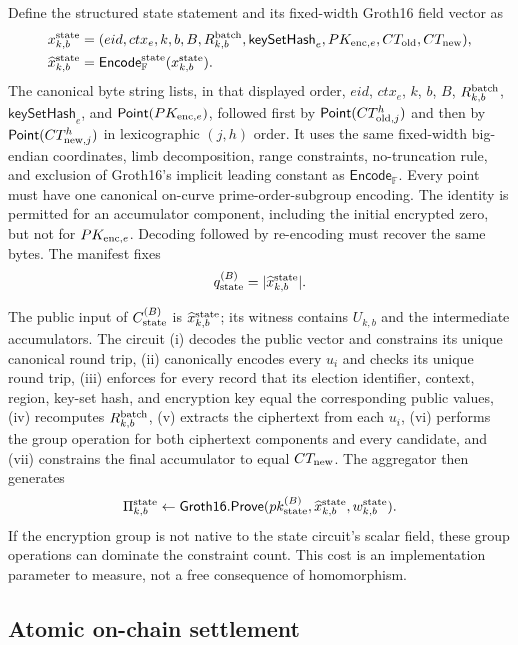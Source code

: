 \documentclass[pdflatex,sn-mathphys-num]{sn-jnl}%
\theoremstyle{thmstyleone}%
\theoremstyle{thmstyletwo}%
\theoremstyle{thmstylethree}%
\begin{document}
Define the structured state statement and its fixed-width Groth16 field vector as
\[
\begin{aligned}
 x_{k,b}^{\rm state}&=(eid,ctx_e,k,b,B,R^{\rm batch}_{k,b},
 \mathsf{keySetHash}_e,PK_{{\rm enc},e},CT_{\rm old},CT_{\rm new}),\\
 \widehat x_{k,b}^{\rm state}&=
 \mathsf{Encode}_{\mathbb F}^{\rm state}(x_{k,b}^{\rm state}).
\end{aligned}
\]
The canonical byte string lists, in that displayed order, $eid$, $ctx_e$, $k$, $b$, $B$, $R^{\rm batch}_{k,b}$, $\mathsf{keySetHash}_e$, and $\mathsf{Point}(PK_{{\rm enc},e})$, followed first by $\mathsf{Point}(CT_{{\rm old},j}^{h})$ and then by $\mathsf{Point}(CT_{{\rm new},j}^{h})$ in lexicographic $(j,h)$ order. It uses the same fixed-width big-endian coordinates, limb decomposition, range constraints, no-truncation rule, and exclusion of Groth16's implicit leading constant as $\mathsf{Encode}_{\mathbb F}$. Every point must have one canonical on-curve prime-order-subgroup encoding. The identity is permitted for an accumulator component, including the initial encrypted zero, but not for $PK_{{\rm enc},e}$. Decoding followed by re-encoding must recover the same bytes. The manifest fixes
\[
 q_{\rm state}^{(B)}=|\widehat x_{k,b}^{\rm state}|.
\]

The public input of $C_{\rm state}^{(B)}$ is $\widehat x_{k,b}^{\rm state}$; its witness contains $U_{k,b}$ and the intermediate accumulators. The circuit (i) decodes the public vector and constrains its unique canonical round trip, (ii) canonically encodes every $u_i$ and checks its unique round trip, (iii) enforces for every record that its election identifier, context, region, key-set hash, and encryption key equal the corresponding public values, (iv) recomputes $R^{\rm batch}_{k,b}$, (v) extracts the ciphertext from each $u_i$, (vi) performs the group operation for both ciphertext components and every candidate, and (vii) constrains the final accumulator to equal $CT_{\rm new}$. The aggregator then generates
\[
 \Pi^{\rm state}_{k,b}\leftarrow
 \mathsf{Groth16.Prove}(pk_{\rm state}^{(B)},
 \widehat x_{k,b}^{\rm state},w_{k,b}^{\rm state}).
\]
If the encryption group is not native to the state circuit's scalar field, these group operations can dominate the constraint count. This cost is an implementation parameter to measure, not a free consequence of homomorphism.

\subsection{Atomic on-chain settlement}\label{subsec:batch-settlement}
\end{document}

